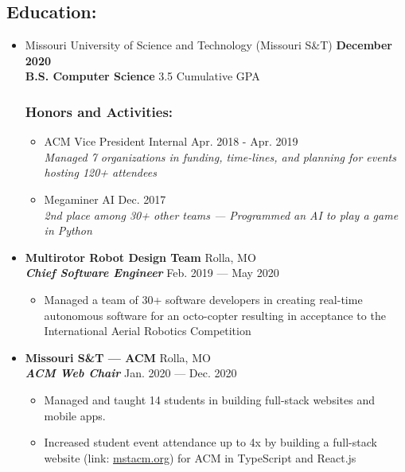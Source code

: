\documentclass[9pt,oneside]{memoir}
\newcommand{\cgpa}{3.5}
\begin{document}
\vspace*{-16px}
\subsection*{Education:}

\begin{itemize}
      \item[] Missouri University of Science and Technology (Missouri S\&T)
            \hfill \textbf{December 2020}\\
            \textbf{B.S. Computer Science}
            \hfill \cgpa{} Cumulative GPA

\vspace*{-10px}
\subsubsection*{Honors and Activities:}

\begin{itemize}
      \item[\textbullet] ACM Vice President Internal
            \hfill Apr. 2018 - Apr. 2019\\
            \textit{Managed 7 organizations in funding, time-lines, and planning for events hosting 120+ attendees}
      \item[\textbullet] Megaminer AI
            \hfill Dec. 2017\\
            \textit{2nd place among 30+ other teams --- Programmed an AI to play a game in Python}
\end{itemize}
   
     \vspace*{-1px}
      \item[] \textbf{Multirotor Robot Design Team}
            \hfill Rolla, MO\\
            \textit{\textbf{Chief Software Engineer}}
            \hfill Feb. 2019 --- May 2020
            \begin{itemize}
                  \item[\textbullet] Managed a team of 30+ software developers in
                        creating real-time autonomous software for an octo-copter resulting in
                        acceptance to the International Aerial Robotics Competition
            \end{itemize}
            
      \item[] \textbf{Missouri S\&T --- ACM}
            \hfill Rolla, MO\\
            \textit{\textbf{ACM Web Chair}}
            \hfill Jan. 2020 --- Dec. 2020
            \begin{itemize}
                  \item[\textbullet] Managed and taught 14 students in building full-stack websites and mobile apps.
                  \item[\textbullet] Increased student event attendance up to 4x by building a full-stack website (link: \url{mstacm.org}) for ACM in TypeScript and React.js
            \end{itemize}

\end{itemize}
\end{document}
